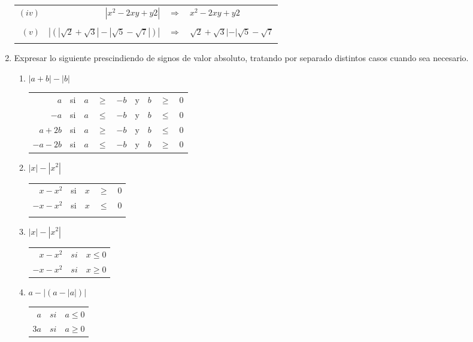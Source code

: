 \begin{enumerate}[\bfseries 1.]
\begin{center}
\begin{tabular}{r r c l}
$(iv)$&$|x^2-2xy+y2|$&$\Rightarrow$&$x^2-2xy+y2$\\\\

$(v)$&$|\left(  |\sqrt{2}+ \sqrt{3}|-|\sqrt{5}-\sqrt{7}|  \right)|$&$\Rightarrow$&$\sqrt{2}+ \sqrt{3}|-|\sqrt{5}-\sqrt{7}$\\\\
\end{tabular}
\end{center}

\item Expresar lo siguiente prescindiendo de signos de valor absoluto, tratando por separado distintos casos cuando sea necesario.
\begin{enumerate}[\bfseries (i)]
\item $|a+b|-|b|$
\begin{center}
\begin{tabular}{rcrclcrcl}
$a$&si&$a$&$\geq$&$-b$&y&$b$&$\geq$&$0$\\
$-a$&si&$a$&$\leq$&$-b$&y&$b$&$\leq$&$0$\\
$a+2b$&si&$a$&$\geq$&$-b$&y&$b$&$\leq$&$0$\\
$-a-2b$&si&$a$&$\leq$&$-b$&y&$b$&$\geq$&$0$\\
\end{tabular}
\end{center}

\item $|x|-|x^2|$
\begin{center}
\begin{tabular}{r c r c l}
$x-x^2$&si&$x$&$\geq$&$0$\\
$-x-x^2$&si&$x$&$\leq$&$0$\\\\
\end{tabular}
\end{center}

\item $|x|-|x^2|$
\begin{center}
\begin{tabular}{rcl}
$x-x^2$&$si$&$x\leq 0$\\
$-x-x^2$&$si$&$x\geq 0$\\
\end{tabular}
\end{center}

\item $a-|(a-|a|)|$ 
\begin{center}
\begin{tabular}{r c l}
$a$&$si$&$a\leq 0$\\
$3a$&$si$&$a\geq 0$\\
\end{tabular}
\end{center} 
\end{enumerate}


\end{enumerate}
